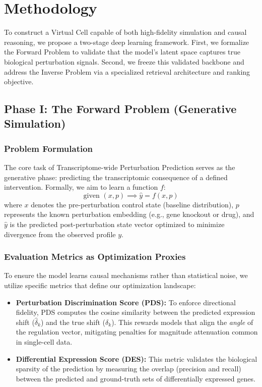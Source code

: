 \documentclass[conference]{IEEEtran}
\begin{document}
\section{Methodology}
To construct a Virtual Cell capable of both high-fidelity simulation and causal reasoning, we propose a two-stage deep learning framework. First, we formalize the Forward Problem to validate that the model's latent space captures true biological perturbation signals. Second, we freeze this validated backbone and address the Inverse Problem via a specialized retrieval architecture and ranking objective.

\subsection{Phase I: The Forward Problem (Generative Simulation)}

\subsubsection{Problem Formulation}
The core task of Transcriptome-wide Perturbation Prediction serves as the generative phase: predicting the transcriptomic consequence of a defined intervention. Formally, we aim to learn a function $f$:
\[
\text{given } (x, p) \implies \hat{y} = f(x, p)
\]
where $x$ denotes the pre-perturbation control state (baseline distribution), $p$ represents the known perturbation embedding (e.g., gene knockout or drug), and $\hat{y}$ is the predicted post-perturbation state vector optimized to minimize divergence from the observed profile $y$.

\subsubsection{Evaluation Metrics as Optimization Proxies}
To ensure the model learns causal mechanisms rather than statistical noise, we utilize specific metrics that define our optimization landscape:
\begin{itemize}
    \item \textbf{Perturbation Discrimination Score (PDS):} To enforce directional fidelity, PDS computes the cosine similarity between the predicted expression shift ($\hat{\delta}_k$) and the true shift ($\delta_k$). This rewards models that align the \textit{angle} of the regulation vector, mitigating penalties for magnitude attenuation common in single-cell data.
    \item \textbf{Differential Expression Score (DES):} This metric validates the biological sparsity of the prediction by measuring the overlap (precision and recall) between the predicted and ground-truth sets of differentially expressed genes.
\end{itemize}
\end{document}
